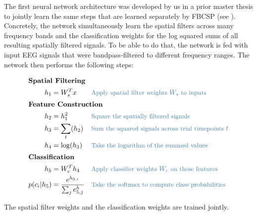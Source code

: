     The first neural network architecture was developed by us in a prior
master thesis \citep{schirrmeister_msc_thesis_2015} to
jointly learn the same steps that are learned separately by FBCSP (see
). Concretely, the network
simultaneously learn the spatial filters across many frequency bands and
the classification weights for the log squared sums of all resulting
spatially filtered signals. To be able to do that, the network is fed
with input EEG signals that were bandpass-filtered to different
frequency ranges. The network then performs the following steps:




\begin{align*}
    \intertext{\textbf{Spatial Filtering}}
    h_1 &= W_s^Tx && \codecomment{\text{Apply spatial filter weights } W_s \text{ to  inputs }} \\
    \intertext{\textbf{Feature Construction}}
    h_2 &= h_1^2 && \codecomment{\text{Square the spatially filtered signals }} \\
    h_3 &=\sum_t (h_2) && \codecomment{\text{Sum the squared signals across trial timepoints } t} \\
    h_4 &= \log(h_3) && \codecomment{\text{Take the logarithm of the summed values}}\\
    \intertext{\textbf{Classification}}
    h_5 &= W_c^Th_4 && \codecomment{\text{Apply classifier weights } W_c \text{ on these features }} \\
    p(c_i|h_5) &= \frac{e^{h_{5,i}}}{\sum_j e^h_{5,j}} && \codecomment{\text{Take the softmax to compute class probabilities}} \\
\end{align*}

    The spatial filter weights and the classification weights are trained
jointly.

